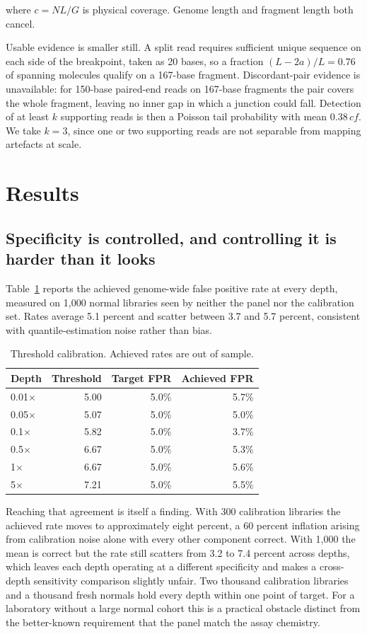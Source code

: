 \documentclass[conference]{IEEEtran}
\begin{document}
where $c = NL/G$ is physical coverage. Genome length and fragment length both
cancel.

Usable evidence is smaller still. A split read requires sufficient unique
sequence on each side of the breakpoint, taken as 20 bases, so a fraction
$(L - 2a)/L = 0.76$ of spanning molecules qualify on a 167-base fragment.
Discordant-pair evidence is unavailable: for 150-base paired-end reads on
167-base fragments the pair covers the whole fragment, leaving no inner gap in
which a junction could fall. Detection of at least $k$ supporting reads is then
a Poisson tail probability with mean $0.38\,cf$. We take $k=3$, since one or
two supporting reads are not separable from mapping artefacts at scale.

\section{Results}

\subsection{Specificity is controlled, and controlling it is harder than it looks}

Table~\ref{tab:calibration} reports the achieved genome-wide false positive
rate at every depth, measured on 1{,}000 normal libraries seen by neither the
panel nor the calibration set. Rates average 5.1 percent and scatter between
3.7 and 5.7 percent, consistent with quantile-estimation noise rather than
bias.

\begin{table}[t]
\caption{Threshold calibration. Achieved rates are out of sample.}
\label{tab:calibration}
\centering
\begin{tabular}{lrrr}
\toprule
Depth & Threshold & Target FPR & Achieved FPR \\
\midrule
0.01$\times$ & 5.00 & 5.0\% & 5.7\% \\
0.05$\times$ & 5.07 & 5.0\% & 5.0\% \\
0.1$\times$  & 5.82 & 5.0\% & 3.7\% \\
0.5$\times$  & 6.67 & 5.0\% & 5.3\% \\
1$\times$    & 6.67 & 5.0\% & 5.6\% \\
5$\times$    & 7.21 & 5.0\% & 5.5\% \\
\bottomrule
\end{tabular}
\end{table}

Reaching that agreement is itself a finding. With 300 calibration libraries the
achieved rate moves to approximately eight percent, a 60 percent inflation
arising from calibration noise alone with every other component correct. With
1{,}000 the mean is correct but the rate still scatters from 3.2 to 7.4 percent
across depths, which leaves each depth operating at a different specificity and
makes a cross-depth sensitivity comparison slightly unfair. Two thousand
calibration libraries and a thousand fresh normals hold every depth within one
point of target. For a laboratory without a large normal cohort this is a
practical obstacle distinct from the better-known requirement that the panel
match the assay chemistry.
\end{document}
